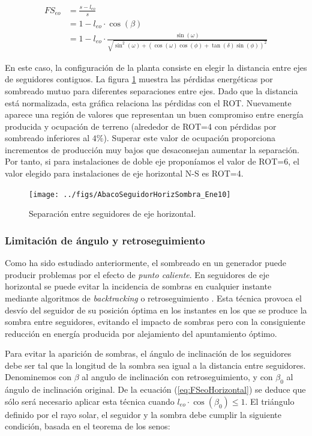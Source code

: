 \begin{align}
FS_{eo} & =\frac{s-l_{eo}}{s}\nonumber \\
 & =1-l_{eo}\cdot\cos(\beta)\nonumber \\
 &
 =1-l_{eo}\cdot\frac{\sin(\omega)}{\sqrt{\sin^{2}(\omega)+\left(\cos(\omega)\cos(\phi)+\tan(\delta)\sin(\phi)\right)^{2}}}\label{eq:FSeoHorizontal}
\end{align}

En este caso, la  configuración
de la planta consiste en elegir la distancia entre ejes de seguidores
contiguos. La figura \ref{fig:SeguidoresEjeHorizontalSeparacion}
muestra las pérdidas energéticas por sombreado mutuo para diferentes
separaciones entre ejes. Dado que la distancia está normalizada, esta gráfica relaciona las pérdidas con el ROT.
Nuevamente aparece una región de valores que representan un buen compromiso
entre energía producida y ocupación de terreno (alrededor de ROT=4
con pérdidas por sombreado inferiores al $4\%$). Superar este valor
de ocupación proporciona incrementos de producción muy bajos que desaconsejan
aumentar la separación. Por tanto, si para instalaciones de doble eje proponíamos el valor
de ROT=6, el valor elegido para instalaciones de eje horizontal N-S
es ROT=4.

\begin{figure}
  \centering
  \texttt{[image: ../figs/AbacoSeguidorHorizSombra\_Ene10]}

  \caption{Separación entre seguidores de eje horizontal.}
  \label{fig:SeguidoresEjeHorizontalSeparacion}
\end{figure}

\subsubsection{Limitación de ángulo y retroseguimiento}
\label{sec:backtracking}

Como ha sido estudiado anteriormente, el sombreado en un generador puede producir problemas por
el efecto de \emph{punto caliente}. En seguidores de eje horizontal se puede evitar la incidencia
de sombras en cualquier instante mediante algoritmos de
\emph{backtracking} o retroseguimiento
\cite{Panico.Garvison.ea1991}. Esta técnica provoca el desvío del seguidor de su posición óptima en los
instantes en los que se produce la sombra entre seguidores, evitando
el impacto de sombras pero con la consiguiente reducción en energía
producida por alejamiento del apuntamiento óptimo.

Para evitar la
aparición de sombras, el ángulo de inclinación de los seguidores debe
ser tal que la longitud de la sombra sea igual a la distancia entre
seguidores. Denominemos con $\beta$ al angulo de inclinación con
retroseguimiento, y con $\beta_0$ al ángulo de inclinación
original. De la ecuación (\ref{eq:FSeoHorizontal}) se deduce que
sólo será necesario aplicar esta técnica cuando $l_{eo} \cdot \cos(\beta_0) \leq 1$. El
triángulo definido por el rayo solar, el seguidor y la sombra debe
cumplir la siguiente condición, basada en el teorema de los senos:


